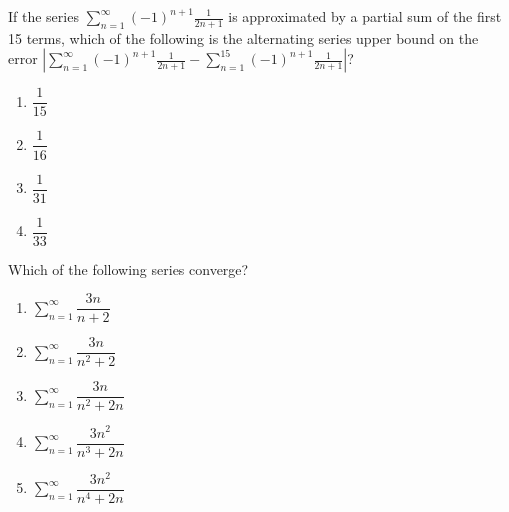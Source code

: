 \documentclass[
]{article}
\begin{document}
\begin{enumerate}
\begin{minipage}{\linewidth}
\end{minipage}

\begin{minipage}{\linewidth}
\item
  If the series
  \(\displaystyle \sum_{n=1}^\infty (-1)^{n+1} \frac{1}{2n+1}\) is
  approximated by a partial sum of the first 15 terms, which of the
  following is the alternating series upper bound on the error
  \(\left | \displaystyle \sum_{n=1}^\infty (-1)^{n+1} \frac{1}{2n+1} - \displaystyle \sum_{n=1}^{15} (-1)^{n+1} \frac{1}{2n+1}\right |\)?

	\vspace{2ex}
  \begin{enumerate}
		\setlength{\itemsep}{2ex}		\def\labelenumi{\Alph{enumi}.}
    \item
    \(\dfrac{1}{15}\)
  \item
    \(\dfrac{1}{16}\)
  \item
    \(\dfrac{1}{31}\)
  \item
    \(\dfrac{1}{33}\)
  \end{enumerate}

	\vspace{0.25in}
	\end{minipage}

\begin{minipage}{\linewidth}
\item
  Which of the following series converge?

	\vspace{2ex}
  \begin{enumerate}
		\setlength{\itemsep}{2ex}		\def\labelenumi{\Alph{enumi}.}
    \item
    \(\displaystyle \sum_{n=1}^\infty \dfrac{3n}{n+2}\)
  \item
    \(\displaystyle \sum_{n=1}^\infty \dfrac{3n}{n^2+2}\)
  \item
    \(\displaystyle \sum_{n=1}^\infty \dfrac{3n}{n^2+2n}\)
  \item
    \(\displaystyle \sum_{n=1}^\infty \dfrac{3n^2}{n^3+2n}\)
  \item
    \(\displaystyle \sum_{n=1}^\infty \dfrac{3n^2}{n^4+2n}\)
  \end{enumerate}
	\vspace{0.25in}

\end{minipage}


\end{enumerate}
\end{document}
